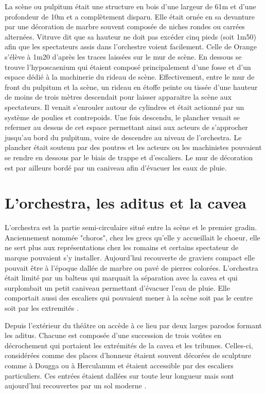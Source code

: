 		La scène ou \gls{pulpitum} était une structure en bois d'une largeur de 61m et d'une profondeur de 10m et a complètement disparu. Elle était ornée en sa devanture par une décoration de marbre souvent composée de niches rondes ou carrées alternées. Vitruve dit que sa hauteur ne doit pas excéder cinq pieds (soit 1m50) afin que les spectateurs assis dans l'orchestre voient facilement. Celle de Orange s'élève à 1m20 d'après les traces laissées sur le mur de scène. En dessous se trouve l'hyposcaenium qui étaient composé principalement d'une fosse et d'un espace dédié à la machinerie du rideau de scène. Effectivement, entre le mur de front du \gls{pulpitum} et la scène, un rideau en étoffe peinte ou tissée d'une hauteur de moins de trois mètres descendait pour laisser apparaitre la scène aux spectateurs. Il venait s'enrouler autour de cylindres et était actionné par un système de poulies et contrepoids. Une fois descendu, le plancher venait se refermer au dessus de cet espace permettant ainsi aux acteurs de s'approcher jusqu'au bord du \gls{pulpitum}, voire de descendre au niveau de l'\gls{orchestra}. Le plancher était soutenu par des poutres et les acteurs ou les machinistes pouvaient se rendre en dessous par le biais de trappe et d'escaliers. Le mur de décoration est par ailleurs bordé par un caniveau afin d'évacuer les eaux de pluie.
						
		\section{L'\gls{orchestra}, les \gls{aditus} et la \gls{cavea}}
		
	
	L'\gls{orchestra} est la partie semi-circulaire situé entre la scène et le premier gradin. Anciennement nommée "choros", chez les grecs qu'elle y accueillait le choeur, elle ne sert plus aux représentations chez les romains et certains spectateur de marque pouvaient s'y installer. Aujourd'hui recouverte de graviers compact elle pouvait être à l'époque dallée de marbre ou pavé de pierres colorées. L'\gls{orchestra} était limité par un \gls{balteus} qui marquait la séparation avec la \gls{cavea} et qui surplombait un petit caniveau permettant d'évacuer l'eau de pluie. Elle comportait aussi des escaliers qui pouvaient mener à la scène soit pas le centre soit par les extremités \citep[p. 52]{formige}.
	
Depuis l'extérieur du théâtre on accède à ce lieu par deux larges \gls{parodos} formant les \gls{aditus}. Chacune est composée d'une succession de trois voûtes en décrochement qui portaient les extrémités de la \gls{cavea} et les tribunes. Celles-ci, considérées comme des places d'honneur étaient souvent décorées de sculpture comme à Dougga ou à Herculanum et étaient accessible par des escaliers particuliers. Ces entrées étaient dallées sur toute leur longueur mais sont aujourd'hui recouvertes par un sol moderne \cite[Pl. XVI]{orangePl}.
	
